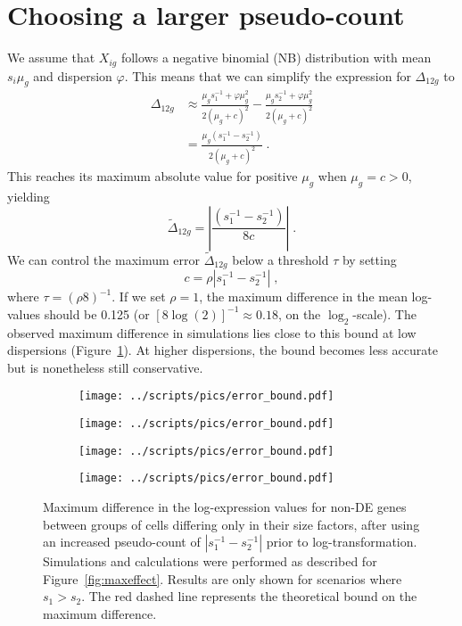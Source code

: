 \documentclass[10pt,letterpaper]{article}
\begin{document}
\section{Choosing a larger pseudo-count}
We assume that $X_{ig}$ follows a negative binomial (NB) distribution with mean $s_i\mu_g$ and dispersion $\varphi$.
This means that we can simplify the expression for $\Delta_{12g}$ to
\begin{align}
\Delta_{12g} 
&\approx \frac{\mu_g s_1^{-1} + \varphi \mu_g^2}{2(\mu_g + c)^2} - \frac{\mu_g s_2^{-1} + \varphi \mu_g^2}{2(\mu_g + c)^2} \nonumber \\
&= \frac{\mu_g (s_1^{-1} - s_2^{-1})}{2(\mu_g + c)^2} \;. \label{eqn:nberr}
\end{align}
This reaches its maximum absolute value for positive $\mu_g$ when $\mu_g = c > 0$, yielding 
\[
\tilde\Delta_{12g} = \left|\frac{(s_1^{-1} - s_2^{-1})}{8c}\right| \;.
\]
We can control the maximum error $\tilde\Delta_{12g}$ below a threshold $\tau$ by setting  
\begin{equation}
    c = \rho |s_1^{-1} - s_2^{-1}| \;, \label{eqn:pseudo} 
\end{equation}
where $\tau = (\rho 8)^{-1}$.
If we set $\rho = 1$, the maximum difference in the mean log-values should be 0.125 (or $[8\log(2)]^{-1} \approx 0.18$, on the $\log_2$-scale).
The observed maximum difference in simulations lies close to this bound at low dispersions (Figure~\ref{fig:cappederr}).
At higher dispersions, the bound becomes less accurate but is nonetheless still conservative.

\begin{figure}[btp]
\centering
\begin{subfigure}[b]{0.49\textwidth}
    \texttt{[image: ../scripts/pics/error\_bound.pdf]}
    \caption{}
\end{subfigure}
\begin{subfigure}[b]{0.49\textwidth}
    \texttt{[image: ../scripts/pics/error\_bound.pdf]}
    \caption{}
\end{subfigure}
\begin{subfigure}[b]{0.49\textwidth}
    \texttt{[image: ../scripts/pics/error\_bound.pdf]}
    \caption{}
\end{subfigure}
\begin{subfigure}[b]{0.49\textwidth}
    \texttt{[image: ../scripts/pics/error\_bound.pdf]}
    \caption{}
\end{subfigure}
\caption{Maximum difference in the log-expression values for non-DE genes between groups of cells differing only in their size factors, 
after using an increased pseudo-count of $|s_1^{-1} - s_2^{-1}|$ prior to log-transformation.
Simulations and calculations were performed as described for Figure~\ref{fig:maxeffect}.
Results are only shown for scenarios where $s_1 > s_2$.
The red dashed line represents the theoretical bound on the maximum difference.
}
\label{fig:cappederr}
\end{figure}
\end{document}
